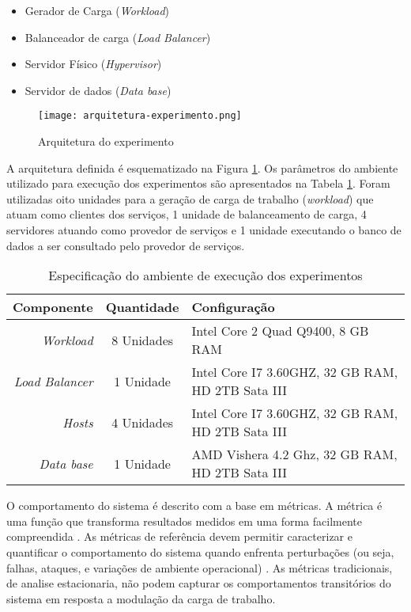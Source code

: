 \begin{itemize}
	\item Gerador de Carga (\textit{Workload})
	\item Balanceador de carga (\textit{Load Balancer})
	\item Servidor Físico (\textit{Hypervisor})
	\item Servidor de dados (\textit{Data base})
\end{itemize}


\begin{figure}[!htb]
	\centering
	\texttt{[image: arquitetura-experimento.png]}
	\caption{Arquitetura do experimento}
	\label{fig:arquitetura-experimento}
	\fautor
\end{figure}

A arquitetura definida é esquematizado na Figura \ref{fig:arquitetura-experimento}. Os parâmetros do ambiente utilizado para execução dos experimentos são apresentados na Tabela \ref{tab:configuracao_maquinas}.
Foram utilizadas oito unidades para a geração de carga de trabalho (\textit{workload}) que atuam como clientes dos serviços, 1 unidade de balanceamento de carga, 4 servidores atuando como provedor de serviços e 1 unidade executando o banco de dados a ser consultado pelo provedor de serviços.

\begin{table}[htb]
	\centering
	\caption{Especificação do ambiente de execução dos experimentos}
	\label{tab:configuracao_maquinas}
	\begin{tabularx}{\textwidth}{|r|c|X|} \hline\hline
		\textbf{Componente}    & \textbf{Quantidade} & \textbf{Configuração} \\ \hline
		\textit{Workload}      & 8 Unidades          & Intel Core 2 Quad Q9400, 8 GB RAM  \\
		\textit{Load Balancer} & 1 Unidade           & Intel Core I7 3.60GHZ, 32 GB RAM, HD 2TB Sata III \\
		\textit{Hosts}         & 4 Unidades          & Intel Core I7 3.60GHZ, 32 GB RAM, HD 2TB Sata III\\
		\textit{Data base}     & 1 Unidade           & AMD Vishera 4.2 Ghz, 32 GB RAM, HD 2TB Sata III \\
		\hline
	\end{tabularx}
	\fdadospesquisa
\end{table}


O comportamento do sistema é descrito com a base em métricas. A métrica é uma função que transforma resultados medidos em uma forma facilmente compreendida \cite{Folkerts2013}. As métricas de referência devem permitir caracterizar e quantificar o comportamento do sistema quando enfrenta perturbações (ou seja, falhas, ataques, e variações de ambiente operacional) \cite{Marco2012}. As métricas tradicionais, de analise estacionaria, não podem capturar os comportamentos transitórios do sistema em resposta a modulação da carga de trabalho.

